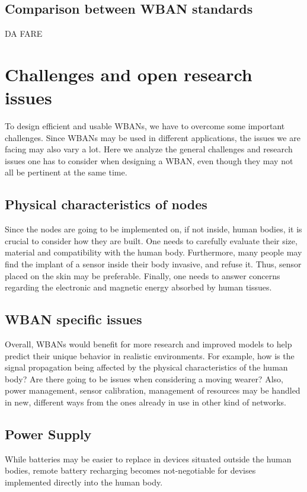 \documentclass[conference]{IEEEtran}
\begin{document}
\subsection{Comparison between WBAN standards}
DA FARE

\section{Challenges and open research issues}
To design efficient and usable WBANs, we have to overcome some important challenges. Since WBANs may be used in different applications, the issues we are facing may also vary a lot. Here we analyze the general challenges and research issues one has to consider when designing a WBAN, even though they may not all be pertinent at the same time.

\subsection {Physical characteristics of nodes}
Since the nodes are going to be implemented on, if not inside, human bodies, it is crucial to consider how they are built. One needs to carefully evaluate their size, material and compatibility with the human body. Furthermore, many people may find the implant of a sensor inside their body invasive, and refuse it. Thus, sensor placed on the skin may be preferable. Finally, one needs to answer concerns regarding the electronic and magnetic energy absorbed by human tissues.

\subsection {WBAN specific issues}
Overall, WBANs would benefit for more research and improved models to help predict their unique behavior in realistic environments. For example, how is the signal propagation being affected by the physical characteristics of the human body? Are there going to be issues when considering a moving wearer? Also, power management, sensor calibration, management of resources may be handled in new, different ways from the ones already in use in other kind of networks.

\subsection {Power Supply}
While batteries may be easier to replace in devices situated outside the human bodies, remote battery recharging becomes not-negotiable for devises implemented directly into the human body.
\end{document}
